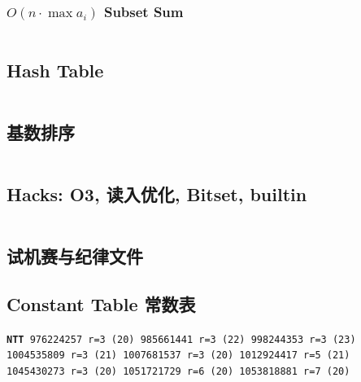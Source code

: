 \documentclass[titlepage, a4paper, 11pt]{article}
\begin{document}
\begin{spacing}{1.15}
				\subsubsection{$O(n \cdot \max a_i)$ Subset Sum}
					\inputminted{cpp}{src/yzh/Subset Sum.cpp}

				\newpage
				\subsection{Hash Table}
					\inputminted[highlightlines={4,15,17,18}]{cpp}{src/DataStructure/hashmap.cpp}
				\subsection{基数排序}
					\inputminted{cpp}{src/Miscellany/RadixSort.cpp}
				\subsection{Hacks: O3, 读入优化, Bitset, builtin}
					\inputminted{cpp}{src/Miscellany/hack.cpp}
				\subsection{试机赛与纪律文件}
				\begin{spacing}{0.3}
					
				\end{spacing}
				\subsection{Constant Table 常数表}
				\label{randomprimes}
				\begin{small}
					\setlength{\parindent}{0em}\setlength{\parskip}{0em}\renewcommand{\baselinestretch}{.8}
					\texttt{\textbf{NTT} 976224257 r=3 (20)
					985661441 r=3 (22)
					998244353 r=3 (23)\\
					1004535809 r=3 (21)
					1007681537 r=3 (20)
					1012924417 r=5 (21)\\
					1045430273 r=3 (20)
					1051721729 r=6 (20)
					1053818881 r=7 (20)				
					}
				\end{small}
				

\end{spacing}
\end{document}
